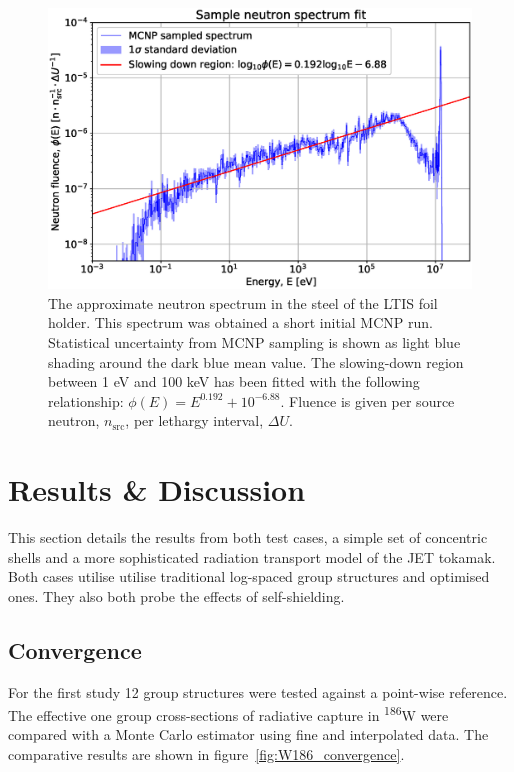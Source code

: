 \begin{figure}[H]
  \centering
  \includegraphics[width=\linewidth]{spectrum}
  \caption[Neutron spectrum used as input for optimisation.]{The approximate neutron spectrum in the steel of the LTIS foil holder. This spectrum was obtained a short initial MCNP run. Statistical uncertainty from MCNP sampling is shown as light blue shading around the dark blue mean value. The slowing-down region between 1 eV and 100 keV has been fitted with the following relationship: $\phi(E) = E^{0.192} + 10^{-6.88}$. Fluence is given per source neutron, $n_{\mathrm{src}}$, per lethargy interval, $\Delta U$.}
  \label{fig:opt_spectrum}
\end{figure}

\section{Results \& Discussion}
\label{sec:results}
This section details the results from both test cases, a simple set of concentric shells and a more sophisticated radiation transport model of the JET tokamak. Both cases utilise utilise traditional log-spaced group structures and optimised ones. They also both probe the effects of self-shielding.

\subsection{Convergence}
For the first study 12 group structures were tested against a point-wise reference. The effective one group cross-sections of radiative capture in \textsuperscript{186}W were compared with a Monte Carlo estimator using fine and interpolated data. The comparative results are shown in figure~\ref{fig:W186_convergence}. 
 
